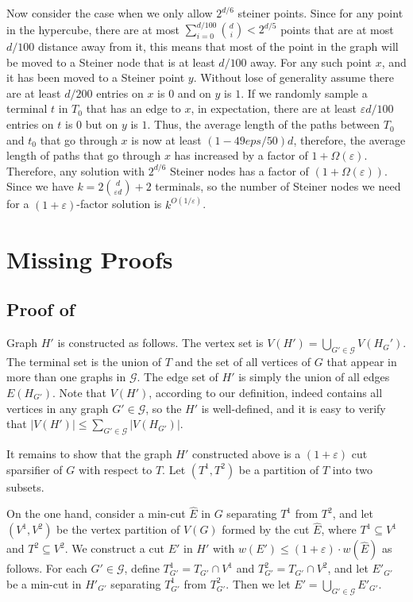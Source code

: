 \documentclass[11pt]{article}
\theoremstyle{definition}
\newcommand{\gset}{{\mathcal{G}}}
\newcommand{\eps}{{\varepsilon}}
\begin{document}
Now consider the case when we only allow $2^{d/6}$ steiner points. Since for any point in the hypercube, there are at most $\sum_{i=0}^{d/100} \binom{d}{i}<2^{d/5}$ points that are at most $d/100$ distance away from it, this means that most of the point in the graph will be moved to a Steiner node that is at least $d/100$ away. For any such point $x$, and it has been moved to a Steiner point $y$. Without lose of generality assume there are at least $d/200$ entries on $x$ is $0$ and on $y$ is $1$. If we randomly sample a terminal $t$ in $T_0$ that has an edge to $x$, in expectation, there are at least $\eps d/100$ entries on $t$ is $0$ but on $y$ is $1$. Thus, the average length of the paths between $T_0$ and $t_0$ that go through $x$ is now at least $(1-49eps/50)d$, therefore, the average length of paths that go through $x$ has increased by a factor of $1+\Omega(\eps)$. Therefore, any solution with $2^{d/6}$ Steiner nodes has a factor of $(1+\Omega(\eps))$. Since we have $k = 2\binom{d}{\eps d}+2$ terminals, so the number of Steiner nodes we need for a $(1+\eps)$-factor solution is $k^{O(1/\eps)}$.

\fi
 
\appendix
\section{Missing Proofs}

\subsection{Proof of }
\label{apd: Proof of lem: divide}

Graph $H'$ is constructed as follows. The vertex set is $V(H')=\bigcup_{G'\in \gset}V(H_G')$. The terminal set is the union of $T$ and the set of all vertices of $G$ that appear in more than one graphs in $\gset$. The edge set of $H'$ is simply the union of all edges $E(H_{G'})$. Note that $V(H')$, according to our definition, indeed contains all vertices in any graph $G'\in \gset$, so the $H'$ is well-defined, and it is easy to verify that $|V(H')|\le \sum_{G'\in \gset}|V(H_{G'})|$.

It remains to show that the graph $H'$ constructed above is a $(1+\eps)$ cut sparsifier of $G$ with respect to $T$. Let $(T^1,T^2)$ be a partition of $T$ into two subsets.

On the one hand, consider a min-cut $\hat E$ in $G$ separating $T^1$ from $T^2$, and let $(V^1,V^2)$ be the vertex partition of $V(G)$ formed by the cut $\hat E$, where $T^1\subseteq V^1$ and $T^2\subseteq V^2$. We construct a cut $E'$ in $H'$ with $w(E')\le (1+\eps)\cdot w(\hat E)$ as follows. 
For each $G'\in \gset$, define $T^1_{G'}=T_{G'}\cap V^1$ and $T^2_{G'}=T_{G'}\cap V^2$, and let $E'_{G'}$ be a min-cut in $H'_{G'}$ separating $T^1_{G'}$ from $T^2_{G'}$. 
Then we let $E'=\bigcup_{G'\in \gset}E'_{G'}$.
\end{document}
